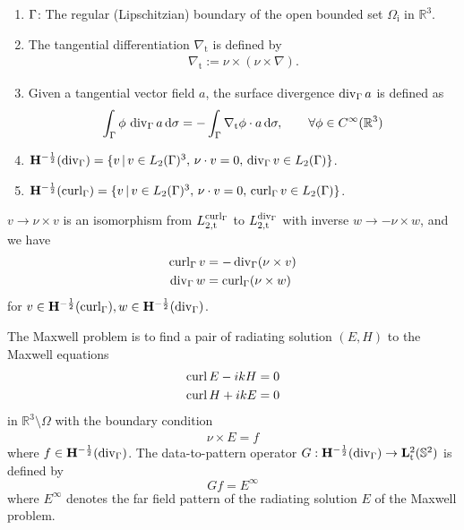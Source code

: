 \begin{dfn}
  \begin{enumerate}
    \item $\Gamma$: The regular (Lipschitzian) boundary of the open bounded set $\Omega_\text{i}$ in $\mathbb{R}^3$. 
    \item The tangential differentiation $\nabla_{\text{t}}$ is defined by 
      \begin{align*}
        \nabla_{\text{t}} :=\nu\times(\nu\times\nabla).
      \end{align*}
    \item Given a tangential vector field $a$, the surface divergence $\operatorname{div}_\Gamma a$ is defined as
      \begin{align*}
        \int_{\Gamma}\phi\,\operatorname{div}_\Gamma a\,\text{d}\sigma=-\int_{\Gamma}\nabla_{\text{t}}\phi\cdot a\,\text{d}\sigma,\qquad\forall\phi\in C^\infty(\mathbb{R}^3)
      \end{align*} 
    \item ${\bf H}^{-\frac{1}{2}}(\operatorname{div}_\Gamma) = \{v\,|\,v\in L_2(\Gamma)^3,\, \nu\cdot v=0, \,\operatorname{div}_\Gamma v\in L_2(\Gamma)\}$.
    \item ${\bf H}^{-\frac{1}{2}}(\operatorname{curl}_\Gamma) = \{v\,|\,v\in L_2(\Gamma)^3,\, \nu\cdot v=0, \,\operatorname{curl}_\Gamma v\in L_2(\Gamma)\}$.
  \end{enumerate}
\end{dfn}

\begin{prp}\label{thm:nuiso}
  $v\to\nu\times v$ is an isomorphism from $L_{2,\text{t}}^{\operatorname{curl}_\Gamma}$ to $L_{2,\text{t}}^{\operatorname{div}_\Gamma}$ with inverse $w\to -\nu\times w$, and we have 
  \begin{align*}
    \operatorname{curl}_\Gamma v &= -\operatorname{div}_\Gamma (\nu\times v) \\
    \operatorname{div}_\Gamma w  &= \operatorname{curl}_\Gamma (\nu\times w)
  \end{align*}
  for $v\in{\bf H}^{-\frac{1}{2}}(\operatorname{curl}_\Gamma), w\in{\bf H}^{-\frac{1}{2}}(\operatorname{div}_\Gamma)$.
\end{prp}

\begin{dfn}
  The Maxwell problem is to find a pair of radiating solution $(E, H)$ to the Maxwell equations
  \begin{align*}
    \operatorname{curl} E - ikH &= 0\\
    \operatorname{curl} H + ikE &= 0
  \end{align*}
  in $\mathbb{R}^3\setminus\Omega$ with the boundary condition
  \begin{align*}
    \nu\times E = f
  \end{align*}
  where $f\in{\bf H}^{-\frac{1}{2}}(\operatorname{div}_\Gamma)$. The data-to-pattern operator $G:{\bf H}^{-\frac{1}{2}}(\operatorname{div}_\Gamma)\rightarrow{\bf L}^2_\text{t}(\mathbb{S}^2)$ is defined by $$Gf=E^\infty$$ where $E^\infty$ denotes the far field pattern of the radiating solution $E$ of the Maxwell problem.
\end{dfn}

